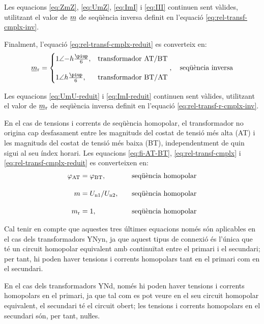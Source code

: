 Les equacions \eqref{eq:ZmZ}, \eqref{eq:UmZ}, \eqref{eq:ImI} i \eqref{eq:III} continuen sent vàlides, utilitzant el valor de $\cmplx{m}$ de seqüència inversa definit en l'equació \eqref{eq:rel-transf-cmplx-inv}.

Finalment, l'equació \eqref{eq:rel-transf-cmplx-reduit} es converteix en:
\begin{equation}\label{eq:rel-transf-r-cmplx-inv}
\cmplx{m}\ped{r}  = 
\begin{cases}
      1\angle{-h}\frac{\piup}{6}, & \text{transformador AT/BT}\\[2.7ex]
      1\angle h\frac{\piup}{6}, & \text{transformador BT/AT}
\end{cases},
\quad\text{seqüència inversa}
\end{equation}

Les equacions \eqref{eq:UmU-reduit} i \eqref{eq:ImI-reduit} continuen sent vàlides, utilitzant el valor de $\cmplx{m}\ped{r}$ de seqüència inversa definit en l'equació \eqref{eq:rel-transf-r-cmplx-inv}.

En el cas de tensions i corrents de seqüència homopolar, el transformador no  origina cap desfasament entre les magnituds  del costat de tensió més alta (AT) i les magnituds del costat de tensió més baixa (BT), independentment de quin sigui al seu índex horari. Les equacions \eqref{eq:fi-AT-BT}, \eqref{eq:rel-transf-cmplx} i \eqref{eq:rel-transf-cmplx-reduit} es converteixen en:
\begin{alignat}{3}
  \varphi_\mathrm{AT} &= \varphi_\mathrm{BT}, &&\quad\text{seqüència homopolar} \\[1em]
  m &= U_\mathrm{n1}/U_\mathrm{n2}, &&\quad\text{seqüència homopolar}\label{eq:rel-transf-cmplx-hom} \\[1em]
  m_\mathrm{r} &= 1, &&\quad\text{seqüència homopolar}
\end{alignat}

Cal tenir en compte que aquestes tres últimes equacions  només són aplicables en el cas dels transformadors YNyn, ja que aquest tipus de connexió és l'única que té un circuit homopolar equivalent amb continuïtat entre el primari i el secundari; per tant, hi poden haver tensions i corrents homopolars tant en el primari com en el secundari.

En el cas dels transformadors YNd, només hi poden haver tensions i corrents homopolars en el primari, ja que tal com es pot veure en el seu circuit homopolar equivalent, el secundari té el circuit obert; les tensions i corrents homopolars en el secundari són, per tant, nuŀles.


